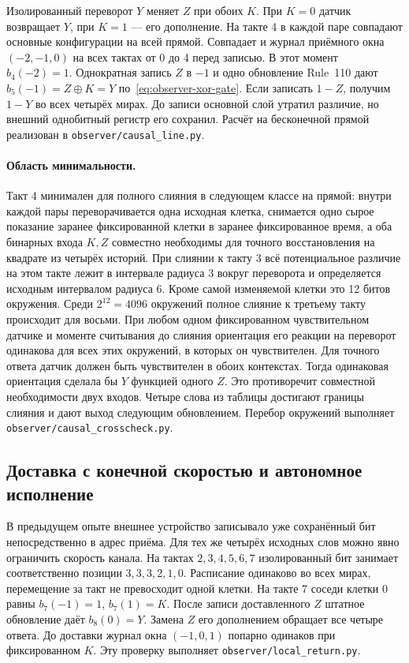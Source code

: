 Изолированный переворот $Y$ меняет $Z$ при обоих $K$. При $K=0$ датчик
возвращает $Y$, при $K=1$ --- его дополнение. На такте 4 в каждой паре
совпадают основные конфигурации на всей прямой. Совпадает и журнал приёмного
окна $(-2,-1,0)$ на всех тактах от 0 до 4 перед записью. В этот момент
$b_4(-2)=1$. Однократная запись $Z$ в $-1$ и одно обновление Rule~110
дают $b_5(-1)=Z\oplus K=Y$ по~\eqref{eq:observer-xor-gate}. Если записать
$1-Z$, получим $1-Y$ во всех четырёх мирах. До записи основной слой утратил
различие, но внешний однобитный регистр его сохранил. Расчёт на бесконечной
прямой реализован в \nolinkurl{observer/causal_line.py}.

\paragraph{Область минимальности.}
Такт 4 минимален для полного слияния в следующем классе на прямой: внутри
каждой пары переворачивается одна исходная клетка, снимается одно сырое
показание заранее фиксированной клетки в заранее фиксированное время, а
оба бинарных входа $K,Z$ совместно необходимы для точного восстановления
на квадрате из четырёх историй. При слиянии к такту 3 всё потенциальное
различие на этом такте лежит в интервале радиуса 3 вокруг переворота и
определяется исходным интервалом радиуса 6. Кроме самой изменяемой клетки
это 12 битов окружения. Среди $2^{12}=4096$ окружений полное слияние к
третьему такту происходит для восьми. При любом одном фиксированном
чувствительном датчике и моменте считывания до слияния ориентация его
реакции на переворот одинакова для всех этих окружений, в которых он
чувствителен. Для точного ответа датчик должен быть чувствителен в обоих
контекстах. Тогда одинаковая ориентация сделала бы $Y$ функцией одного $Z$.
Это противоречит совместной необходимости двух входов. Четыре слова из
таблицы достигают границы слияния и дают выход следующим обновлением.
Перебор окружений выполняет \nolinkurl{observer/causal_crosscheck.py}.

\subsection{Доставка с конечной скоростью и автономное исполнение}

В предыдущем опыте внешнее устройство записывало уже сохранённый бит
непосредственно в адрес приёма. Для тех же четырёх исходных слов можно
явно ограничить скорость канала. На тактах $2,3,4,5,6,7$ изолированный бит
занимает соответственно позиции $3,3,3,2,1,0$. Расписание одинаково во всех
мирах, перемещение за такт не превосходит одной клетки. На такте 7 соседи
клетки $0$ равны $b_7(-1)=1$, $b_7(1)=K$. После записи доставленного $Z$
штатное обновление даёт $b_8(0)=Y$. Замена $Z$ его дополнением обращает
все четыре ответа. До доставки журнал окна $(-1,0,1)$ попарно одинаков при
фиксированном $K$. Эту проверку выполняет \nolinkurl{observer/local_return.py}.

